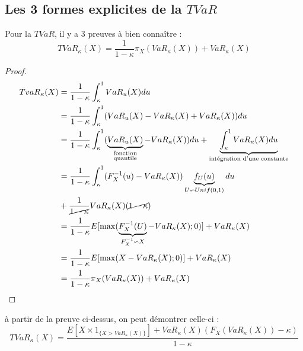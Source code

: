 \subsection{Les 3 formes explicites de la $TVaR$	}
\label{sec:preuve}

Pour la $TVaR$, il y a 3 preuves à bien connaître : 
\begin{equation*}
TVaR_\kappa(X) = \frac{1}{1 - \kappa} \pi_X(VaR_\kappa(X)) + VaR_\kappa(X)
\end{equation*}


\begin{proof}
\label{preuve:tvar_stoploss}
\begin{align*}
TvaR_\kappa(X)  & = \frac{1}{1 - \kappa} \int_\kappa^1 VaR_u(X) du \\
    & = \frac{1}{1 - \kappa} \int_\kappa^1 (VaR_u(X) - VaR_\kappa(X) + VaR_\kappa(X)) du \\
    & = \frac{1}{1 - \kappa} \int_\kappa^1 (\underbrace{VaR_u(X)}_{\substack{\text{fonction} \\ \text{quantile}}} - VaR_\kappa(X)) du + \underbrace{\int_\kappa^1 VaR_\kappa(X) du}_{\text{intégration d'une constante}} \\
    & = \frac{1}{1 - \kappa} \int_\kappa^1 (F_X^{-1}(u) - VaR_\kappa(X)) \underbrace{f_U(u)}_{U \backsim Unif(0,1)} du  \\
    & + \frac{1}{\cancel{1 - \kappa}} VaR_\kappa(X) (\cancel{1 - \kappa}) \\
    & = \frac{1}{1 - \kappa} E[\max(\underbrace{F_X^{-1}(U)}_{F_X^{-1} \backsim X} - VaR_\kappa(X);0)] + VaR_\kappa(X) \\
    & = \frac{1}{1 - \kappa} E[\max(X - VaR_\kappa(X) ; 0)] + VaR_\kappa(X) \\
    & = \frac{1}{1 - \kappa} \pi_X(VaR_\kappa(X)) + VaR_\kappa(X) \\
\end{align*}
\end{proof}

à partir de la preuve ci-dessus, on peut démontrer celle-ci : 
$$
TVaR_\kappa(X) = \frac{E[X \times 1_{\{X > VaR_\kappa(X) \}}] + VaR_\kappa(X)(F_X(VaR_\kappa(X)) - \kappa)}{1-\kappa} 
$$

